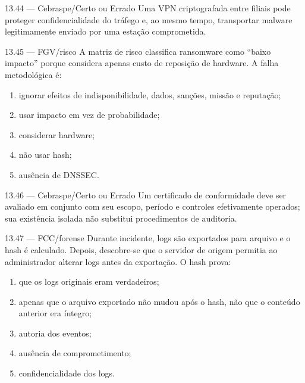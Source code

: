 \begin{questao}{ 13.44 — Cebraspe/Certo ou Errado}
Uma VPN criptografada entre filiais pode proteger confidencialidade do tráfego e, ao mesmo tempo, transportar malware legitimamente enviado por uma estação comprometida.
\end{questao}

\begin{questao}{ 13.45 — FGV/risco}
A matriz de risco classifica ransomware como ``baixo impacto'' porque considera apenas custo de reposição de hardware. A falha metodológica é:
\begin{enumerate}[label=\Alph*)]
\item ignorar efeitos de indisponibilidade, dados, sanções, missão e reputação;
\item usar impacto em vez de probabilidade;
\item considerar hardware;
\item não usar hash;
\item ausência de DNSSEC.
\end{enumerate}
\end{questao}

\begin{questao}{ 13.46 — Cebraspe/Certo ou Errado}
Um certificado de conformidade deve ser avaliado em conjunto com seu escopo, período e controles efetivamente operados; sua existência isolada não substitui procedimentos de auditoria.
\end{questao}

\begin{questao}{ 13.47 — FCC/forense}
Durante incidente, logs são exportados para arquivo e o hash é calculado. Depois, descobre-se que o servidor de origem permitia ao administrador alterar logs antes da exportação. O hash prova:
\begin{enumerate}[label=\Alph*)]
\item que os logs originais eram verdadeiros;
\item apenas que o arquivo exportado não mudou após o hash, não que o conteúdo anterior era íntegro;
\item autoria dos eventos;
\item ausência de comprometimento;
\item confidencialidade dos logs.
\end{enumerate}
\end{questao}

